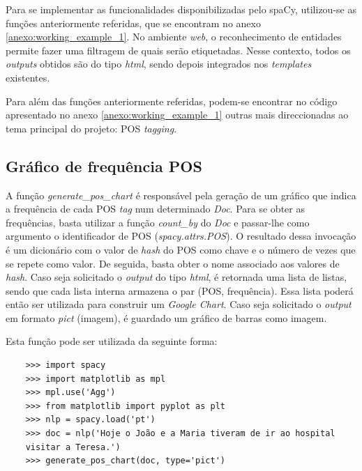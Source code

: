 \documentclass[12pt]{article}
\begin{document}
Para se implementar as funcionalidades disponibilizadas pelo spaCy, utilizou-se as funções anteriormente referidas, que se encontram no anexo \ref{anexo:working_example_1}. No ambiente \textit{web}, o reconhecimento de entidades permite fazer uma filtragem de quais serão etiquetadas. Nesse contexto, todos os \textit{outputs} obtidos são do tipo \textit{html}, sendo depois integrados nos \textit{templates} existentes.

Para além das funções anteriormente referidas, podem-se encontrar no código apresentado no anexo \ref{anexo:working_example_1} outras mais direccionadas ao tema principal do projeto: POS \textit{tagging}. 

\subsection{Gráfico de frequência POS}

A função \textit{generate\_pos\_chart} é responsável pela geração de um gráfico que indica a frequência de cada POS \textit{tag} num determinado \textit{Doc}. Para se obter as frequências, basta utilizar a função \textit{count\_by} do \textit{Doc} e passar-lhe como argumento o identificador de POS (\textit{spacy.attrs.POS}). O resultado dessa invocação é um dicionário com o valor de \textit{hash} do POS como chave e o número de vezes que se repete como valor. De seguida, basta obter o nome associado aos valores de \textit{hash}. Caso seja solicitado o \textit{output} do tipo \textit{html}, é retornada uma lista de listas, sendo que cada lista interna armazena o par (POS, frequência). Essa lista poderá então ser utilizada para construir um \textit{Google Chart}. Caso seja solicitado o \textit{output} em formato \textit{pict} (imagem), é guardado um gráfico de barras como imagem.

Esta função pode ser utilizada da seguinte forma:

\begin{verbatim}
	>>> import spacy
	>>> import matplotlib as mpl
	>>> mpl.use('Agg')
	>>> from matplotlib import pyplot as plt
	>>> nlp = spacy.load('pt')
	>>> doc = nlp('Hoje o João e a Maria tiveram de ir ao hospital
	visitar a Teresa.')
	>>> generate_pos_chart(doc, type='pict')
\end{verbatim}
\end{document}
